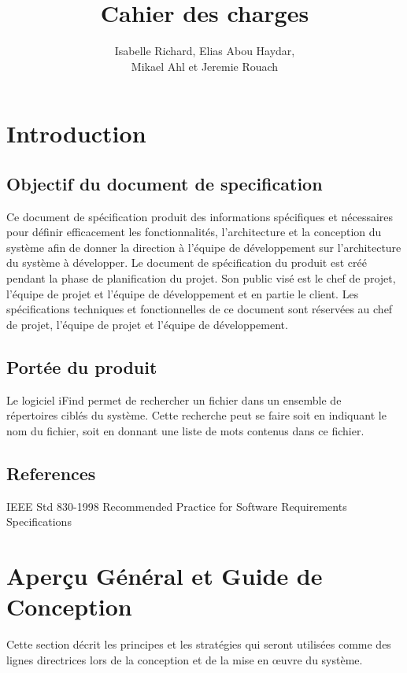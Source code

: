 \documentclass[a4paper,10pt]{article}
\title{Cahier des charges}
\author{Isabelle Richard, Elias Abou Haydar, \\Mikael Ahl et Jeremie Rouach}
\begin{document}
\maketitle

\tableofcontents
\newpage



\section{Introduction}

\subsection{Objectif du document de specification} 
Ce document de spécification produit des informations spécifiques et nécessaires
pour définir efficacement les fonctionnalités, l'architecture et la conception
du système afin de donner la direction à l'équipe de développement sur
l'architecture du système à développer. Le document de spécification du produit
est créé pendant la phase de planification du projet. Son public visé est le
chef de projet, l'équipe de projet et l'équipe de développement et en partie le
client. Les spécifications techniques et fonctionnelles de ce document sont
réservées au chef de projet, l'équipe de projet et l'équipe de développement.


\subsection{Portée du produit}
Le logiciel iFind permet de rechercher un fichier dans un ensemble de\\
répertoires ciblés du système. Cette recherche peut se faire soit en indiquant
le nom du fichier, soit en donnant une liste de mots contenus dans ce fichier.




\subsection{References}
IEEE Std 830-1998 Recommended Practice for Software Requirements Specifications 

\newpage

\section{Aperçu Général et Guide de Conception}
Cette section décrit les principes et les stratégies qui seront utilisées comme
des lignes directrices lors de la conception et de la mise en œuvre du système.
\end{document}
